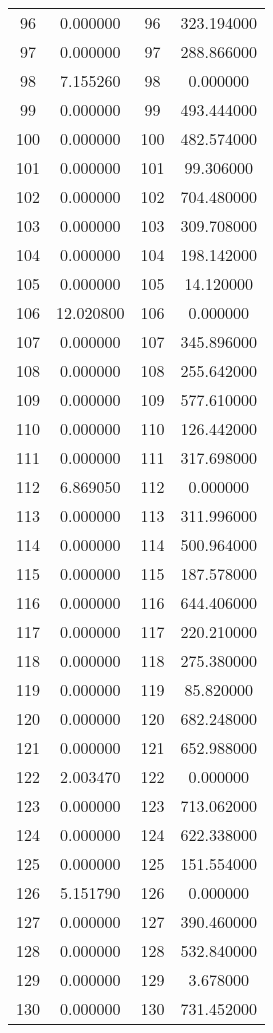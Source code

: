 \documentclass[12pt]{article}
\begin{document}
\begin{longtable}{@{}cccc@{}}
96 & 0.000000 & 96 & 323.194000 \\
97 & 0.000000 & 97 & 288.866000 \\
98 & 7.155260 & 98 & 0.000000 \\
99 & 0.000000 & 99 & 493.444000 \\
100 & 0.000000 & 100 & 482.574000 \\
101 & 0.000000 & 101 & 99.306000 \\
102 & 0.000000 & 102 & 704.480000 \\
103 & 0.000000 & 103 & 309.708000 \\
104 & 0.000000 & 104 & 198.142000 \\
105 & 0.000000 & 105 & 14.120000 \\
106 & 12.020800 & 106 & 0.000000 \\
107 & 0.000000 & 107 & 345.896000 \\
108 & 0.000000 & 108 & 255.642000 \\
109 & 0.000000 & 109 & 577.610000 \\
110 & 0.000000 & 110 & 126.442000 \\
111 & 0.000000 & 111 & 317.698000 \\
112 & 6.869050 & 112 & 0.000000 \\
113 & 0.000000 & 113 & 311.996000 \\
114 & 0.000000 & 114 & 500.964000 \\
115 & 0.000000 & 115 & 187.578000 \\
116 & 0.000000 & 116 & 644.406000 \\
117 & 0.000000 & 117 & 220.210000 \\
118 & 0.000000 & 118 & 275.380000 \\
119 & 0.000000 & 119 & 85.820000 \\
120 & 0.000000 & 120 & 682.248000 \\
121 & 0.000000 & 121 & 652.988000 \\
122 & 2.003470 & 122 & 0.000000 \\
123 & 0.000000 & 123 & 713.062000 \\
124 & 0.000000 & 124 & 622.338000 \\
125 & 0.000000 & 125 & 151.554000 \\
126 & 5.151790 & 126 & 0.000000 \\
127 & 0.000000 & 127 & 390.460000 \\
128 & 0.000000 & 128 & 532.840000 \\
129 & 0.000000 & 129 & 3.678000 \\
130 & 0.000000 & 130 & 731.452000 \\

\end{longtable}
\end{document}
